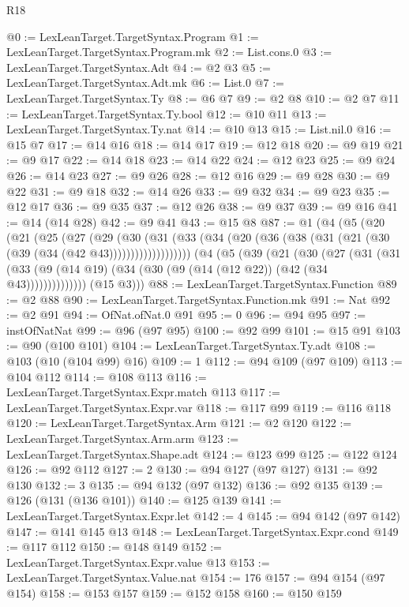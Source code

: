 \begin{lexlean}{R18}
\begin{coremodule}
@0 := LexLeanTarget.TargetSyntax.Program
@1 := LexLeanTarget.TargetSyntax.Program.mk
@2 := List.cons.{0}
@3 := LexLeanTarget.TargetSyntax.Adt
@4 := @2 @3
@5 := LexLeanTarget.TargetSyntax.Adt.mk
@6 := List.{0}
@7 := LexLeanTarget.TargetSyntax.Ty
@8 := @6 @7
@9 := @2 @8
@10 := @2 @7
@11 := LexLeanTarget.TargetSyntax.Ty.bool
@12 := @10 @11
@13 := LexLeanTarget.TargetSyntax.Ty.nat
@14 := @10 @13
@15 := List.nil.{0}
@16 := @15 @7
@17 := @14 @16
@18 := @14 @17
@19 := @12 @18
@20 := @9 @19
@21 := @9 @17
@22 := @14 @18
@23 := @14 @22
@24 := @12 @23
@25 := @9 @24
@26 := @14 @23
@27 := @9 @26
@28 := @12 @16
@29 := @9 @28
@30 := @9 @22
@31 := @9 @18
@32 := @14 @26
@33 := @9 @32
@34 := @9 @23
@35 := @12 @17
@36 := @9 @35
@37 := @12 @26
@38 := @9 @37
@39 := @9 @16
@41 := @14 (@14 @28)
@42 := @9 @41
@43 := @15 @8
@87 := @1
    (@4
      (@5
        (@20
          (@21
            (@25
              (@27
                (@29
                  (@30
                    (@31
                      (@33 (@34 (@20 (@36 (@38 (@31 (@21 (@30 (@39 (@34 (@42 @43)))))))))))))))))))
      (@4
        (@5
          (@39
            (@21
              (@30
                (@27
                  (@31
                    (@31
                      (@33 (@9 (@14 @19) (@34 (@30 (@9 (@14 (@12 @22)) (@42 (@34 @43))))))))))))))
        (@15 @3)))
@88 := LexLeanTarget.TargetSyntax.Function
@89 := @2 @88
@90 := LexLeanTarget.TargetSyntax.Function.mk
@91 := Nat
@92 := @2 @91
@94 := OfNat.ofNat.{0} @91
@95 := 0
@96 := @94 @95
@97 := instOfNatNat
@99 := @96 (@97 @95)
@100 := @92 @99
@101 := @15 @91
@103 := @90 (@100 @101)
@104 := LexLeanTarget.TargetSyntax.Ty.adt
@108 := @103 (@10 (@104 @99) @16)
@109 := 1
@112 := @94 @109 (@97 @109)
@113 := @104 @112
@114 := @108 @113
@116 := LexLeanTarget.TargetSyntax.Expr.match @113
@117 := LexLeanTarget.TargetSyntax.Expr.var
@118 := @117 @99
@119 := @116 @118
@120 := LexLeanTarget.TargetSyntax.Arm
@121 := @2 @120
@122 := LexLeanTarget.TargetSyntax.Arm.arm
@123 := LexLeanTarget.TargetSyntax.Shape.adt
@124 := @123 @99
@125 := @122 @124
@126 := @92 @112
@127 := 2
@130 := @94 @127 (@97 @127)
@131 := @92 @130
@132 := 3
@135 := @94 @132 (@97 @132)
@136 := @92 @135
@139 := @126 (@131 (@136 @101))
@140 := @125 @139
@141 := LexLeanTarget.TargetSyntax.Expr.let
@142 := 4
@145 := @94 @142 (@97 @142)
@147 := @141 @145 @13
@148 := LexLeanTarget.TargetSyntax.Expr.cond
@149 := @117 @112
@150 := @148 @149
@152 := LexLeanTarget.TargetSyntax.Expr.value @13
@153 := LexLeanTarget.TargetSyntax.Value.nat
@154 := 176
@157 := @94 @154 (@97 @154)
@158 := @153 @157
@159 := @152 @158
@160 := @150 @159

\end{coremodule}
\end{lexlean}
